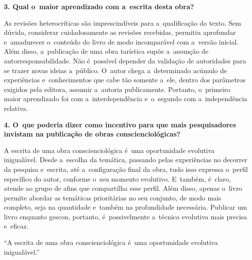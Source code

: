 \documentclass{gescons}
\begin{document}
\begin{multicols}{2}
\textbf{3.       Qual o~maior aprendizado com a~escrita desta obra?}

As revisões heterocríticas são imprescindíveis para a~qualificação do texto. Sem dúvida, considerar cuidadosamente as revisões recebidas, permitiu aprofundar e~amadurecer o~conteúdo do livro de modo incomparável com a~versão inicial. Além disso, a~publicação de uma obra tarística supõe a~assunção de autorresponsabilidade. Não é~possível depender da validação de autoridades para se trazer novas ideias a~público. O~autor chega a~determinado acúmulo de experiências e~conhecimentos que cabe tão somente a~ele, dentro dos parâmetros exigidos pela editora, assumir a~autoria publicamente. Portanto, o~primeiro maior aprendizado foi com a~interdependência e~o~segundo com a~independência relativa.


\textbf{4.       O~que poderia dizer como incentivo para que mais pesquisadores invistam na publicação de obras conscienciológicas?}

A escrita de uma obra conscienciológica é~uma oportunidade evolutiva inigualável. Desde a~escolha da temática, passando pelas experiências no decorrer da pesquisa e~escrita, até a~configuração final da obra, tudo isso expressa o~perfil específico do autor, conforme o~seu momento evolutivo. E~também, é~claro, atende ao grupo de afins que compartilha esse perfil. Além disso, apenas o~livro permite abordar as temáticas prioritárias no seu conjunto, de modo mais completo, seja na quantidade e~também na profundidade necessária. Publicar um livro enquanto gescon, portanto, é~possivelmente a~técnica evolutiva mais precisa e~eficaz.

\begin{pullquote}
``A escrita de uma obra conscienciológica é~uma oportunidade evolutiva inigualável.''
\end{pullquote}

        
    \end{multicols}
\end{document}
